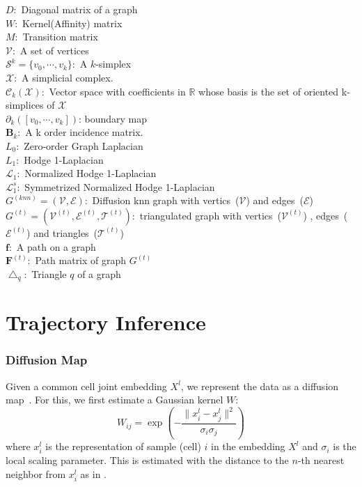 $D: $ Diagonal matrix of a graph\\
$W: $ Kernel(Affinity) matrix \\
$M: $ Transition matrix \\
$\mathcal{V}: $ A set of vertices\\
$\mathcal{S}^k = \{{v}_0,\cdots,{v}_k \}: $ A $k$-simplex\\
$\mathcal{X}: $ A simplicial complex.\\
$\mathcal{C}_k(\mathcal{X}): $ Vector space with coefficients in $\mathbb{R}$ whose basis is the set of oriented k-simplices of $\mathcal{X}$\\
$\partial_k ([v_0,\cdots, v_k])$: boundary map\\
$\mathbf{B}_k: $ A k order incidence matrix.\\
$L_0: $ Zero-order Graph Laplacian\\
$L_1: $ Hodge 1-Laplacian\\
$\mathcal{L}_1: $ Normalized Hodge 1-Laplacian\\
$\mathcal{L}_1^s: $ Symmetrized Normalized Hodge 1-Laplacian\\
$G^{(knn)} = (\mathcal{V}, \mathcal{E}): $ Diffusion knn graph with vertics~($\mathcal{V}$) and edges~($\mathcal{E}$) \\
$G^{(t)} = (\mathcal{V}^{(t)} , \mathcal{E}^{(t)} , \mathcal{T}^{(t)}): $ triangulated graph with vertics~($\mathcal{V}^{(t)}$) , edges~($\mathcal{E}^{(t)}$) and triangles~($\mathcal{T}^{(t)}$)\\
$\mathbf{f}: $ A path on a graph\\
$\mathbf{F}^(t): $ Path matrix of graph $G^{(t)}$ \\
$\bigtriangleup_{q}: $ Triangle $q$ of a graph\\
\section{Trajectory Inference}
\label{TI_methods:TI}



\subsubsection{Diffusion Map}

Given a common cell joint embedding $X^l$, we represent the data as a diffusion map~\citep{coifman2005geometric}. For this, we first estimate a Gaussian kernel $W$:
\begin{equation}
\label{eqn:gussiankernel}
W_{ij} = \exp\left({-\frac{\|x_i^l - x_j^l\|^2}{\sigma_i \sigma_j}}\right)
\end{equation}
\noindent where $x^l_i$ is the representation of sample (cell) $i$ in the embedding $X^l$ and $\sigma_i$ is the local scaling parameter. This is estimated with the distance to the $n$-th nearest neighbor from $x^l_i$ as in \cite{zelnik2004self}.

